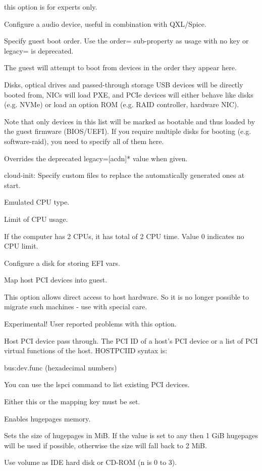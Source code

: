 this option is for experts only.

Configure a audio device, useful in combination with QXL/Spice.

Specify guest boot order. Use the order= sub-property as usage with no key or legacy= is deprecated.

The guest will attempt to boot from devices in the order they appear here.

Disks, optical drives and passed-through storage USB devices will be directly booted from, NICs will load PXE, and PCIe devices will either behave like disks (e.g. NVMe) or load an option ROM (e.g. RAID controller, hardware NIC).

Note that only devices in this list will be marked as bootable and thus loaded by the guest firmware (BIOS/UEFI). If you require multiple disks for booting (e.g. software-raid), you need to specify all of them here.

Overrides the deprecated legacy=[acdn]* value when given.

cloud-init: Specify custom files to replace the automatically generated ones at start.

Emulated CPU type.

Limit of CPU usage.

If the computer has 2 CPUs, it has total of 2 CPU time. Value 0 indicates no CPU limit.

Configure a disk for storing EFI vars.

Map host PCI devices into guest.

This option allows direct access to host hardware. So it is no longer possible to migrate such machines - use with special care.

Experimental! User reported problems with this option.

Host PCI device pass through. The PCI ID of a host’s PCI device or a list of PCI virtual functions of the host. HOSTPCIID syntax is:

bus:dev.func (hexadecimal numbers)

You can use the lspci command to list existing PCI devices.

Either this or the mapping key must be set.

Enables hugepages memory.

Sets the size of hugepages in MiB. If the value is set to any then 1 GiB hugepages will be used if possible, otherwise the size will fall back to 2 MiB.

Use volume as IDE hard disk or CD-ROM (n is 0 to 3).

